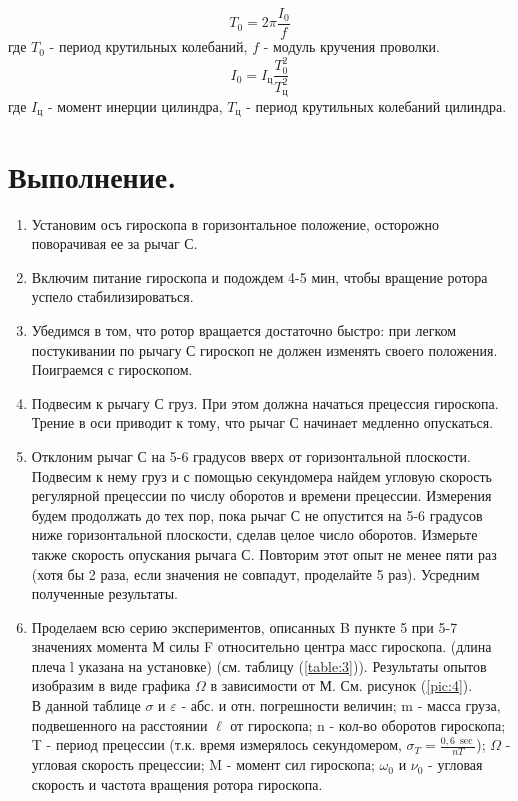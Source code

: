 \documentclass[a4paper,12pt]{article} %
\begin{document}
\begin{equation} T_0 = 2\pi\frac{I_0}{f} \label{eq:10} \end{equation}
где $T_0$ - период крутильных колебаний, $f$ - модуль кручения проволки.
\begin{equation} I_0 = I_{\text{ц}} \frac{T_0^2}{T_{\text{ц}}^2} \label{eq:11} \end{equation}
где $I_\text{ц}$ - момент инерции цилиндра, $T_\text{ц}$ - период крутильных колебаний цилиндра.

\section{Выполнение.}
\begin{enumerate}
  \item \label{Выполнение:1} Установим осъ гироскопа в горизонтальное положение, осторожно поворачивая ее за рычаг С.
  \item \label{Выполнение:2} Включим питание гироскопа и подождем 4-5 мин‚ чтобы вращение ротора успело стабилизироваться.
  \item \label{Выполнение:3} Убедимся в том, что ротор вращается достаточно быстро: при легком постукивании по рычагу С гироскоп не должен изменять своего положения. Поиграемся с гироскопом.
  \item \label{Выполнение:4} Подвесим к рычагу С груз. При этом должна начаться прецессия гироскопа. Трение в оси приводит к тому, что рычаг С начинает медленно опускаться.
  \item \label{Выполнение:5} Отклоним рычаг С на 5-6 градусов вверх от горизонтальной плоскости. Подвесим к нему груз и с помощью секундомера найдем угловую скорость регулярной прецессии по числу оборотов и времени прецессии. Измерения будем продолжать до тех пор, пока рычаг С не опустится на 5-6 градусов ниже горизонтальной плоскости, сделав целое число оборотов. Измерьте также скорость опускания рычага С. Повторим этот опыт не менее пяти раз (хотя бы 2 раза, если значения не совпадут, проделайте 5 раз). Усредним полученные результаты.
  \item \label{Выполнение:6} Проделаем всю серию экспериментов, описанных B пункте 5 при 5-7 значениях момента М силы F относительно центра масс гироскопа. (длина плеча l указана на установке) (см. таблицу (\ref{table:3})). Результаты опытов изобразим в виде графика $\Omega$ в зависимости от М. См. рисунок (\ref{pic:4}). \\
  
В данной таблице $\sigma$ и $\varepsilon$ - абс. и отн. погрешности величин; m - масса груза, подвешенного на расстоянии $\ell$ от гироскопа; n - кол-во оборотов гироскопа; T - период прецессии (т.к. время измерялось секундомером, $\sigma_{T} = \frac{0,6\ \sec}{nT}$); $\Omega$ - угловая скорость прецессии; M - момент сил гироскопа; $\omega_0$ и $\nu_0$ - угловая скорость и частота вращения ротора гироскопа.


\end{enumerate}
\end{document}
